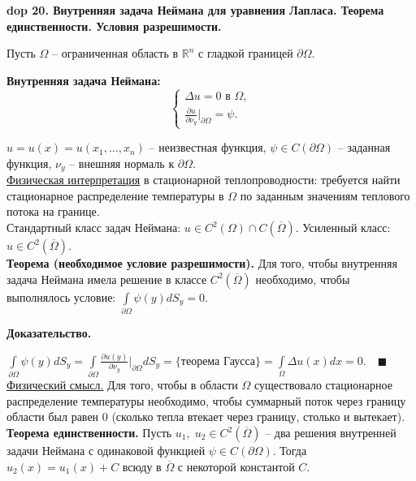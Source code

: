 \textbf{\LARGE dop 20. Внутренняя задача Неймана для уравнения Лапласа. Теорема единственности. Условия разрешимости.}

Пусть $\Omega$ -- ограниченная область в $\mathbb{R}^n$ с гладкой границей $\partial \Omega$.

\textbf{Внутренняя задача Неймана:}
\begin{equation*}
    \begin{cases}
    \Delta u = 0 \text{ в } \Omega, \\
    \frac{\partial u}{\partial \nu_y} \bigg |_{\partial \Omega} = \psi.
    \end{cases}
\end{equation*}

$u = u(x) = u(x_1, \ldots, x_n)$ -- неизвестная функция, $\psi \in C(\partial \Omega)$ -- заданная функция, $\nu_y$ -- внешняя нормаль к $\partial \Omega$.\\

\underline{Физическая интерпретация} в стационарной теплопроводности: требуется найти стационарное распределение температуры в $\Omega$ по заданным значениям теплового потока на границе.\\

Стандартный класс задач Неймана: $u \in C^2(\Omega) \cap C(\overline{\Omega})$. Усиленный класс: $u \in C^2(\overline{\Omega})$.\\

\textbf{Теорема (необходимое условие разрешимости).} Для того, чтобы внутренняя задача Неймана имела решение в классе $C^2(\overline{\Omega})$ необходимо, чтобы выполнялось условие: $\int\limits_{\partial \Omega} \psi(y) dS_y = 0$.

\textbf{Доказательство.} 

$\int\limits_{\partial \Omega} \psi(y) dS_y = \int\limits_{\partial \Omega} \frac{\partial u(y)}{\partial \nu_y} \bigg |_{\partial \Omega} dS_y = \{\text{теорема Гаусса}\} = \int\limits_\Omega \Delta u(x) dx = 0.\quad \blacksquare$
\newline \newline
\underline{Физический смысл.} Для того, чтобы в области $\Omega$ существовало стационарное распределение температуры необходимо, чтобы суммарный поток через границу области был равен 0 (сколько тепла втекает через границу, столько и вытекает).\\

\textbf{Теорема единственности.} Пусть $u_1, \; u_2 \in C^2(\overline{\Omega})$ -- два решения внутренней задачи Неймана с одинаковой функцией $\psi \in C(\partial \Omega)$. Тогда $u_2(x) = u_1(x) + C$ всюду в $\overline{\Omega}$ с некоторой константой $C$.

